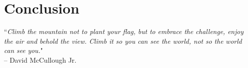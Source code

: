
\chapter{Conclusion} %

\label{Chapter8} 

\noindent\hrulefill
\vspace{0.5cm} %

        
\begin{flushright}  
        ``\emph{Climb the mountain not to plant your flag, but to embrace the challenge, enjoy the air and behold the view. Climb it so you can see the world, not so the world can see you.}"
\\ 
-- David McCullough Jr.\\
\end{flushright}

\vspace{0.5cm}

\noindent \hrulefill
\clearpage

\normalsize

